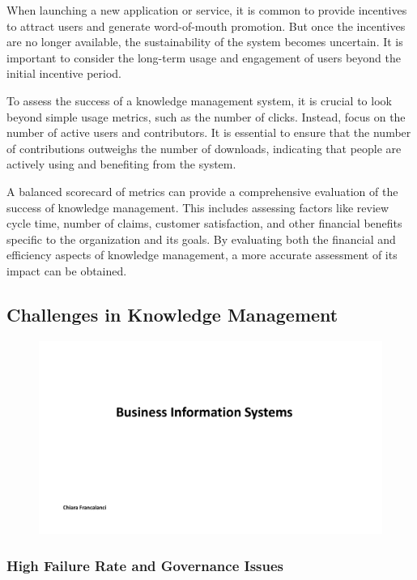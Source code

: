 When launching a new application or service, it is common to provide
incentives to attract users and generate word-of-mouth promotion. But
once the incentives are no longer available, the sustainability of the
system becomes uncertain. It is important to consider the long-term
usage and engagement of users beyond the initial incentive period.

To assess the success of a knowledge management system, it is crucial to
look beyond simple usage metrics, such as the number of clicks. Instead,
focus on the number of active users and contributors. It is essential to
ensure that the number of contributions outweighs the number of
downloads, indicating that people are actively using and benefiting from
the system.

A balanced scorecard of metrics can provide a comprehensive evaluation
of the success of knowledge management. This includes assessing factors
like review cycle time, number of claims, customer satisfaction, and
other financial benefits specific to the organization and its goals. By
evaluating both the financial and efficiency aspects of knowledge
management, a more accurate assessment of its impact can be obtained.

\subsection{Challenges in Knowledge
  Management}\label{challenges-in-knowledge-management}

\begin{figure}[!h]
  \centering
  \includegraphics[page=18, trim = 1.5cm 5.5cm 3cm 4cm, clip, width=\imagewidth]{images/05 - KM.pdf}
\end{figure}

\subsubsection{High Failure Rate and Governance
  Issues}\label{high-failure-rate-and-governance-issues}

